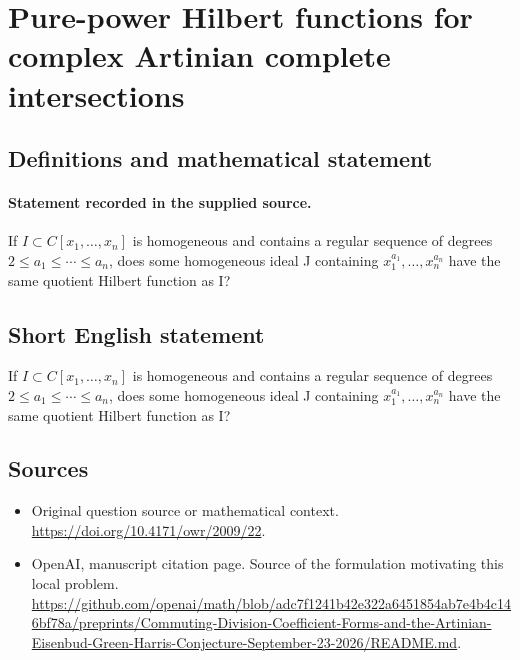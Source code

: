 \documentclass[11pt]{article}
\begin{document}
\section*{Pure-power Hilbert functions for complex Artinian complete intersections}\label{statement}
\subsection{Definitions and mathematical statement}
\paragraph{Statement recorded in the supplied source.}
If $I\subset C[x_{1},\dots ,x_{n}]$ is homogeneous and contains a regular sequence of degrees $2\leq a_{1}\leq \cdots \leq a_{n}$, does some homogeneous ideal J containing $x_{1}^{a_{1}},\dots ,x_{n}^{a_{n}}$ have the same quotient Hilbert function as I?
\subsection{Short English statement}
If $I\subset C[x_{1},\dots ,x_{n}]$ is homogeneous and contains a regular sequence of degrees $2\leq a_{1}\leq \cdots \leq a_{n}$, does some homogeneous ideal J containing $x_{1}^{a_{1}},\dots ,x_{n}^{a_{n}}$ have the same quotient Hilbert function as I?
\subsection{Sources}
\begin{itemize}
\item[S1] Original question source or mathematical context.
\url{https://doi.org/10.4171/owr/2009/22}.
\item[S2] OpenAI, manuscript citation page. Source of the formulation motivating this local problem.
\url{https://github.com/openai/math/blob/adc7f1241b42e322a6451854ab7e4b4c146bf78a/preprints/Commuting-Division-Coefficient-Forms-and-the-Artinian-Eisenbud-Green-Harris-Conjecture-September-23-2026/README.md}.
\end{itemize}
\end{document}
